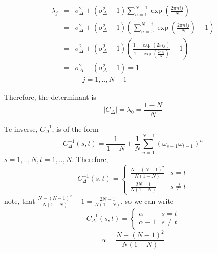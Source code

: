 \documentclass{report}
\begin{document}
\begin{eqnarray*}
\lambda_j & = & \sigma^2_{\Delta} +(\sigma^2_{\Delta}-1)\sum_{n=1}^{N-1}\exp(\frac{2\pi nij}{N})\\
& = & \sigma^2_{\Delta} +(\sigma^2_{\Delta}-1)\left(\sum_{n=0}^{N-1}\exp(\frac{2\pi nij}{N})-1 \right)\\
 & = &  \sigma^2_{\Delta} +(\sigma^2_{\Delta}-1)\left(\frac{1-\exp(2\pi ij)}{1-\exp(\frac{2\pi ij}{N})}-1 \right)\\
  & =&  \sigma^2_{\Delta} -(\sigma^2_{\Delta}-1) = 1 \\
  && \quad j=1,..,N-1
\end{eqnarray*}

Therefore, the determinant is
\begin{equation*}
|C_\Delta|=\lambda_0=\frac{1-N}{N}
\end{equation*}

Te inverse, $C_\Delta ^{-1}$, is of the form
\begin{equation*}
C_\Delta^{-1}(s,t)=
\frac{1}{1-N}+\frac{1}{N}\sum_{n=1}^{N-1}(\omega_{s-1}\omega_{t-1})^n
\end{equation*}
$s=1,..,N, t=1,..,N$. Therefore,
\begin{equation*}
C^{-1}_\Delta(s,t) = 
\begin{cases}
\frac{N-(N-1)^2}{N(1-N)} & s=t\\
\frac{2N-1}{N(1-N)}      & s\neq t
\end{cases}
\end{equation*}
note, that $\frac{N-(N-1)^2}{N(1-N)}-1 = \frac{2N-1}{N(1-N)} $, so we can write 
\begin{equation*}
C^{-1}_\Delta(s,t) = 
\begin{cases}
\alpha    & s=t\\
\alpha-1  & s\neq t
\end{cases}
\end{equation*}
\begin{equation*}
 \alpha=\frac{N-(N-1)^2}{N(1-N)}
\end{equation*}
 
\end{document}
